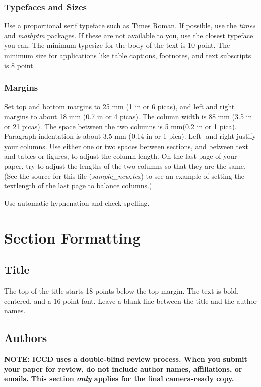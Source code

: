 \documentclass[letterpaper, 10 pt, conference]{ieeeconf}  %
\begin{document}
\subsubsection{Typefaces and Sizes} Use a proportional serif typeface such as Times Roman. 
If possible, use the {\em times} and {\em mathptm} packages.
If these are not available to you, use the closest typeface you
  can. The minimum typesize for the body of the text is 10 point. The minimum
  size for applications like table captions, footnotes, and text subscripts
  is 8 point. 

\subsubsection{Margins} Set top and
bottom margins to 25 mm (1 in or 6 picas), and left and right margins
to about 18 mm (0.7 in or 4 picas). The column width is 88 mm (3.5 in or 21 picas).
 The space between the two columns is 5 mm(0.2 in or 1 pica). Paragraph
 indentation is about 3.5 mm (0.14 in or 1 pica). Left- and right-justify your
 columns. Use either one or two spaces between sections,
 and between text and tables or figures, to adjust the column length.
  On the last page of your paper, try to adjust the lengths of the
  two-columns so that they are the same. (See the source for this file 
({\em sample\_new.tex}) to see an example of setting the \\textlength 
of the last page to balance columns.)

Use automatic hyphenation and check spelling. 

\section{Section Formatting}

\subsection{Title} 

The top of the title starts 18 points below the top margin.
The text is bold, centered, and a 16-point font.  Leave a blank line between
the title and the author names.

\subsection{Authors}  

\textbf{NOTE: ICCD uses a double-blind review process.  When you submit your paper
for review, do not include author names, affiliations, or emails.  This section
{\em only} applies for the final camera-ready copy.}
\end{document}
